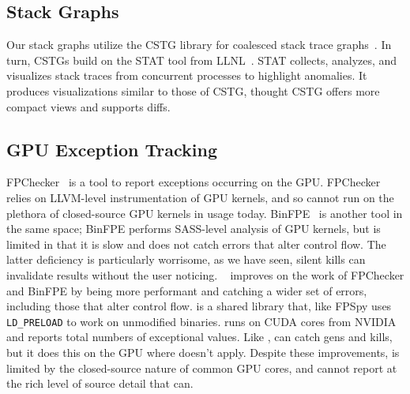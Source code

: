 \documentclass{juliacon}
\begin{document}
\subsection{Stack Graphs}

Our stack graphs utilize the CSTG library for coalesced stack trace graphs~\cite{humphreySystematicDebuggingMethods2014}.
In turn, CSTGs build on the STAT tool from LLNL~\cite{arnoldStackTraceAnalysis2007}.
STAT collects, analyzes, and visualizes stack traces from concurrent processes
to highlight anomalies.
It produces visualizations similar to those of CSTG, thought CSTG offers more compact views and supports diffs.

\subsection{GPU Exception Tracking}

FPChecker~\cite{l-ase-2019} is a tool to report \fp{} exceptions occurring on the GPU.
FPChecker relies on LLVM-level instrumentation of GPU kernels, and so cannot run on the plethora of closed-source GPU kernels in usage today.
BinFPE~\cite{llg-soap-2022} is another tool in the same space;
BinFPE performs SASS-level analysis of GPU kernels, but is limited in that it is slow and does not catch errors that alter control flow.
The latter deficiency is particularly worrisome, as we have seen, silent \NaN{} kills can invalidate results without the user noticing.
\GPUFPX{}~\cite{llsflg-hpdc-2023} improves on the work of FPChecker and BinFPE by being more performant and catching a wider set of errors, including those that alter control flow.
\GPUFPX{} is a shared library that, like FPSpy uses \texttt{LD\_PRELOAD} to work on unmodified binaries.
\GPUFPX{} runs on CUDA cores from NVIDIA and reports total numbers of exceptional values.
Like \TF{}, \GPUFPX{} can catch \NaN{} gens and kills, but it does this on the GPU where \TF{} doesn't apply.
Despite these improvements, \GPUFPX{} is limited by the closed-source nature of common GPU cores, and cannot report at the rich level of source detail that \TF{} can.


\end{document}
